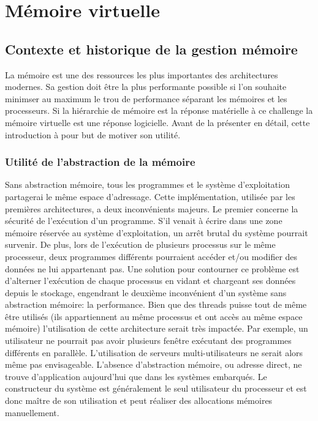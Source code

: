 \section{Mémoire virtuelle} \label{sec:memoire_virtuelle}


\subsection{Contexte et historique de la gestion mémoire}

La mémoire est une des ressources les plus importantes des architectures modernes. Sa gestion doit être la plus performante possible  si l'on souhaite minimser au maximum le trou de performance séparant les mémoires et les processeurs. Si la hiérarchie de mémoire est la réponse matérielle à ce challenge la mémoire virtuelle est une réponse logicielle. Avant de la présenter en détail, cette introduction à pour but de motiver son utilité.

\subsubsection{Utilité de l'abstraction de la mémoire}

Sans abstraction mémoire, tous les programmes et le système d'exploitation partagerai le même espace d'adressage. Cette implémentation, utilisée par les premières architectures, a deux inconvénients majeurs. Le premier concerne la sécurité de l'exécution d'un programme. S'il venait à écrire dans une zone mémoire réservée au système d'exploitation, un arrêt brutal du système pourrait survenir. De plus, lors de l'exécution de plusieurs processus sur le même processeur, deux programmes différents pourraient accéder et/ou modifier des données ne lui appartenant pas. Une solution pour contourner ce problème est d'alterner l'exécution de chaque processus en vidant et chargeant ses données depuis le stockage, engendrant le deuxième inconvénient d'un système sans abstraction mémoire: la performance. Bien que des threads puisse tout de même être utilisés (ils appartiennent au même processus et ont accès au même espace mémoire) l'utilisation de cette architecture serait très impactée. Par exemple, un utilisateur ne pourrait pas avoir plusieurs fenêtre exécutant des programmes différents en parallèle. L'utilisation de serveurs multi-utilisateurs ne serait alors même pas envisageable. L'absence d'abstraction mémoire, ou adresse direct, ne trouve d'application aujourd'hui que dans les systèmes embarqués. Le constructeur du système est généralement le seul utilisateur du processeur et est donc maître de son utilisation et peut réaliser des allocations mémoires manuellement.

